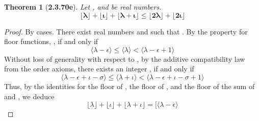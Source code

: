 \documentclass[a4paper, 12pt]{article}
\theoremstyle{plain}
\newtheorem*{theorem*}{Theorem}
\begin{document}
\begin{theorem*}[\textbf{2.3.70e}]
    Let \bm{$\lambda$}, and \bm{$\iota$} be real numbers.
    \begin{equation*}
        \bm{
            \big \lfloor \lambda \rfloor 
                + 
            \big \lfloor \iota \rfloor  
                + 
            \big \lfloor \lambda + \iota \rfloor 
                \le 
            \big \lfloor 2 \lambda \rfloor 
                + 
            \big \lfloor 2 \iota \rfloor
        }
    \end{equation*}
\end{theorem*}
\begin{proof}
    By cases.
    There exist real numbers \bm{$\epsilon$} and \bm{$\sigma$} such that
    \bm{$\lambda - \lfloor \lambda \rfloor = \epsilon$}. 
    By the property for floor functions,
    \bm{$\lfloor \lambda \rfloor = \lambda - \epsilon$},
    if and only if
    \begin{equation*}
        \Big \langle \lambda - \epsilon \Big \rangle
            \leq 
        \Big \langle \lambda \Big \rangle
            < 
        \Big \langle \lambda - \epsilon + 1 \Big \rangle
    \end{equation*}
    Without loss of generality with respect to \bm{$\iota$}, 
    by the additive compatibility law from the order axioms,
    there exists an integer 
    \bm{$
        \lfloor \lambda + \iota \rfloor 
            = 
        \big \langle \lambda - \epsilon \big \rangle
            +
        \big \langle \iota - \sigma \big \rangle$},
    if and only if
    \begin{equation*}
        \Big \langle
            \lambda - \epsilon
                + 
            \iota - \sigma
        \Big \rangle
            \leq 
        \Big \langle \lambda + \iota \Big \rangle
            < 
        \Big \langle
            \lambda - \epsilon
                + 
            \iota - \sigma
                + 
            1
        \Big \rangle
    \end{equation*}
    Thus, by the identities for the floor of \bm{$\lambda$},
    the floor of \bm{$\iota$}, 
    and the floor of the sum of \bm{$\lambda$} and \bm{$\iota$},
    we deduce 
    \begin{equation*}
        \big \lfloor \lambda \big \rfloor
            +
        \big \lfloor \iota \big \rfloor
            +
        \big \lfloor \lambda + \iota \big \rfloor
            =
        \Big[
            \big \langle \lambda - \epsilon \big \rangle

\end{equation*}
\end{proof}
\end{document}
